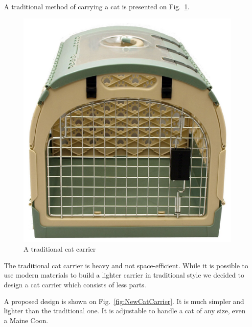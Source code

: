 \documentclass[runningheads,a4paper]{llncs}
\begin{document}
A traditional method of carrying a cat is presented on Fig.~\ref{fig:TraditionalCatCarrier}.

%
\begin{figure}
	\centering
	\includegraphics[width=\linewidth]{TraditionalCatCarrier}
	\caption{A traditional cat carrier}
	\label{fig:TraditionalCatCarrier}
\end{figure}
%

The traditional cat carrier is heavy and not space-efficient. While it is
possible to use modern materials to build a lighter carrier in traditional
style we decided to design a cat carrier which consists of less parts.

A proposed design is shown on Fig.~\ref{fig:NewCatCarrier}. It is much simpler
and lighter than the traditional one. It is adjustable to handle a cat of any
size, even a Maine Coon.
\end{document}
